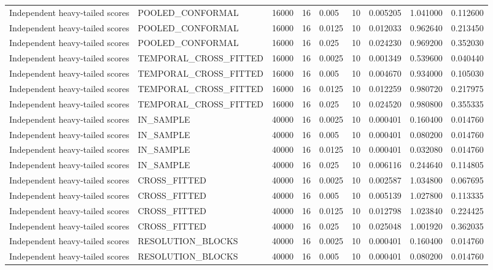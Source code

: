 \begin{tabular}{lllllllll}
Independent heavy-tailed scores & POOLED\_CONFORMAL & 16000 & 16 & 0.005 & 10 & 0.005205 & 1.041000 & 0.112600 \\
Independent heavy-tailed scores & POOLED\_CONFORMAL & 16000 & 16 & 0.0125 & 10 & 0.012033 & 0.962640 & 0.213450 \\
Independent heavy-tailed scores & POOLED\_CONFORMAL & 16000 & 16 & 0.025 & 10 & 0.024230 & 0.969200 & 0.352030 \\
Independent heavy-tailed scores & TEMPORAL\_CROSS\_FITTED & 16000 & 16 & 0.0025 & 10 & 0.001349 & 0.539600 & 0.040440 \\
Independent heavy-tailed scores & TEMPORAL\_CROSS\_FITTED & 16000 & 16 & 0.005 & 10 & 0.004670 & 0.934000 & 0.105030 \\
Independent heavy-tailed scores & TEMPORAL\_CROSS\_FITTED & 16000 & 16 & 0.0125 & 10 & 0.012259 & 0.980720 & 0.217975 \\
Independent heavy-tailed scores & TEMPORAL\_CROSS\_FITTED & 16000 & 16 & 0.025 & 10 & 0.024520 & 0.980800 & 0.355335 \\
Independent heavy-tailed scores & IN\_SAMPLE & 40000 & 16 & 0.0025 & 10 & 0.000401 & 0.160400 & 0.014760 \\
Independent heavy-tailed scores & IN\_SAMPLE & 40000 & 16 & 0.005 & 10 & 0.000401 & 0.080200 & 0.014760 \\
Independent heavy-tailed scores & IN\_SAMPLE & 40000 & 16 & 0.0125 & 10 & 0.000401 & 0.032080 & 0.014760 \\
Independent heavy-tailed scores & IN\_SAMPLE & 40000 & 16 & 0.025 & 10 & 0.006116 & 0.244640 & 0.114805 \\
Independent heavy-tailed scores & CROSS\_FITTED & 40000 & 16 & 0.0025 & 10 & 0.002587 & 1.034800 & 0.067695 \\
Independent heavy-tailed scores & CROSS\_FITTED & 40000 & 16 & 0.005 & 10 & 0.005139 & 1.027800 & 0.113335 \\
Independent heavy-tailed scores & CROSS\_FITTED & 40000 & 16 & 0.0125 & 10 & 0.012798 & 1.023840 & 0.224425 \\
Independent heavy-tailed scores & CROSS\_FITTED & 40000 & 16 & 0.025 & 10 & 0.025048 & 1.001920 & 0.362035 \\
Independent heavy-tailed scores & RESOLUTION\_BLOCKS & 40000 & 16 & 0.0025 & 10 & 0.000401 & 0.160400 & 0.014760 \\
Independent heavy-tailed scores & RESOLUTION\_BLOCKS & 40000 & 16 & 0.005 & 10 & 0.000401 & 0.080200 & 0.014760 \\

\end{tabular}
